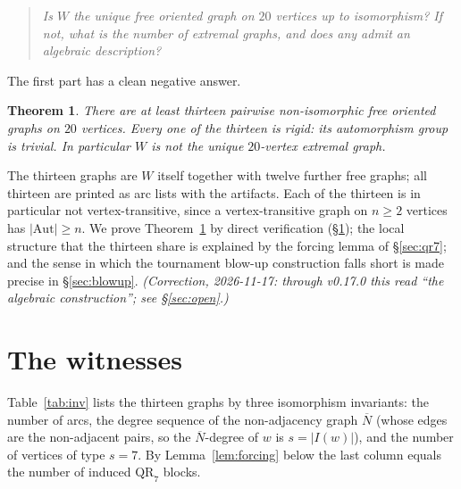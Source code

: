 \documentclass[11pt]{amsart}
\newcommand{\QR}{\mathrm{QR}_7}
\newcommand{\Aut}{\mathrm{Aut}}
\theoremstyle{plain}
\newtheorem{theorem}{Theorem}[section]
\theoremstyle{definition}
\theoremstyle{remark}
\begin{document}
\begin{quote}
\emph{Is $W$ the unique free oriented graph on $20$ vertices up to
isomorphism? If not, what is the number of extremal graphs, and does any
admit an algebraic description?}
\end{quote}

The first part has a clean negative answer.

\begin{theorem}\label{thm:main}
There are at least thirteen pairwise non-isomorphic free oriented graphs
on $20$ vertices. Every one of the thirteen is rigid: its automorphism
group is trivial. In particular $W$ is not the unique $20$-vertex
extremal graph.
\end{theorem}

The thirteen graphs are $W$ itself together with twelve further free
graphs; all thirteen are printed as arc lists with the artifacts. Each of
the thirteen is in particular not vertex-transitive, since a
vertex-transitive graph on $n\ge 2$ vertices has $|\Aut|\ge n$. We
prove Theorem~\ref{thm:main} by direct verification
(\S\ref{sec:witnesses}); the local structure that the thirteen share is
explained by the forcing lemma of \S\ref{sec:qr7}; and the sense in which
the tournament blow-up construction falls short is made precise in
\S\ref{sec:blowup}. \emph{(Correction, 2026-11-17: through v0.17.0 this
read ``the algebraic construction''; see \S\ref{sec:open}.)}

\section{The witnesses}\label{sec:witnesses}

Table~\ref{tab:inv} lists the thirteen graphs by three isomorphism
invariants: the number of arcs, the degree sequence of the
non-adjacency graph $\overline{N}$ (whose edges are the non-adjacent
pairs, so the $\overline{N}$-degree of $w$ is $s=|I(w)|$), and the number
of vertices of type $s=7$. By Lemma~\ref{lem:forcing} below the last
column equals the number of induced $\QR$ blocks.
\end{document}
